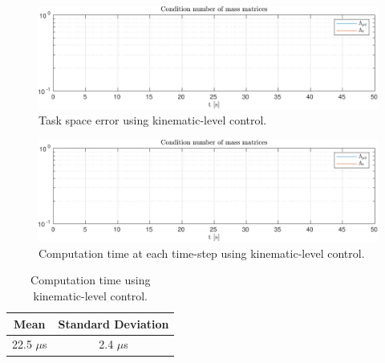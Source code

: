 \begin{figure}[h!]
    \centering
    \includegraphics[page=2,width=\linewidth]{assets/results/kinematic/h5data.pdf}
    \caption{Task space error using kinematic-level control.}
    \label{}
\end{figure}
\begin{figure}[h!]
    \centering
    \includegraphics[page=3,width=\linewidth]{assets/results/kinematic/h5data.pdf}
    \caption{Computation time at each time-step using kinematic-level control.}
    \label{}
\end{figure}

\begin{table}[h!]
    \centering
    \begin{tabular}{|c|c|}
        \hline
        Mean & Standard Deviation \\ \hline
        22.5 $\mu$s & 2.4 $\mu$s \\ \hline
    \end{tabular}
    \caption{Computation time using kinematic-level control.}
\end{table}

